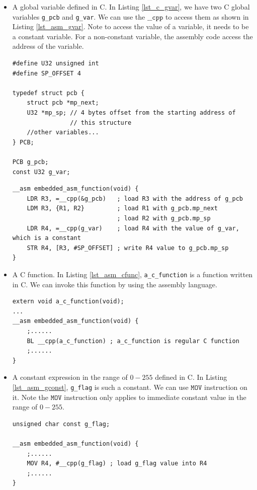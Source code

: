 \begin{itemize}
\item A global variable defined in C. In Listing \ref{lst_c_gvar}, we have two C global variables \verb+g_pcb+ and \verb+g_var+. We can use the $\mathtt{\_\_cpp}$ to access them as shown in Listing \ref{lst_asm_gvar}. Note to access the value of a variable, it needs to be a constant variable. For a non-constant variable, the assembly code access the address of the variable.

\begin{lstlisting}[caption={Example of accessing C global variables from assembly. The C code.}, label=lst_c_gvar]
#define U32 unsigned int 
#define SP_OFFSET 4

typedef struct pcb {
    struct pcb *mp_next;
    U32 *mp_sp; // 4 bytes offset from the starting address of
                // this structure
    //other variables...
} PCB;

PCB g_pcb;
const U32 g_var;
\end{lstlisting}


\begin{lstlisting}[style=asm, caption={Example of accessing global variable from assembly}, label=lst_asm_gvar]
__asm embedded_asm_function(void) { 
    LDR R3, =__cpp(&g_pcb)   ; load R3 with the address of g_pcb
    LDM R3, {R1, R2}         ; load R1 with g_pcb.mp_next
                             ; load R2 with g_pcb.mp_sp
    LDR R4, =__cpp(g_var)    ; load R4 with the value of g_var, which is a constant
    STR R4, [R3, #SP_OFFSET] ; write R4 value to g_pcb.mp_sp
}
\end{lstlisting}
\item A C function. In Listing \ref{lst_asm_cfunc}, \verb+a_c_function+ is a function written in C. We can invoke this function by using the assembly language. 
\begin{lstlisting}[style=asm, caption={Example of accessing c function from assembly}, label=lst_asm_cfunc]
extern void a_c_function(void);
...
__asm embedded_asm_function(void) {
    ;......
    BL __cpp(a_c_function) ; a_c_function is regular C function
    ;......
}
\end{lstlisting}
\item A constant expression in the range of $0-255$ defined in C. In Listing \ref{lst_asm_gconst}, \verb+g_flag+ is such a constant. We can use $\mathtt{MOV}$ instruction on it. 
Note the $\mathtt{MOV}$ instruction only applies to immediate constant value in the range of $0-255$. 
\begin{lstlisting}[style=asm, caption={Example of accessing constant from assembly}, label=lst_asm_gconst]
unsigned char const g_flag;

__asm embedded_asm_function(void) {
    ;......
    MOV R4, #__cpp(g_flag) ; load g_flag value into R4
    ;......
}
\end{lstlisting}
\end{itemize}

